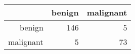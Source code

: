 \begin{tabular}{rrr}
  \hline
 & benign & malignant \\ 
  \hline
benign & 146 &   5 \\ 
  malignant &   5 &  73 \\ 
   \hline
\end{tabular}
